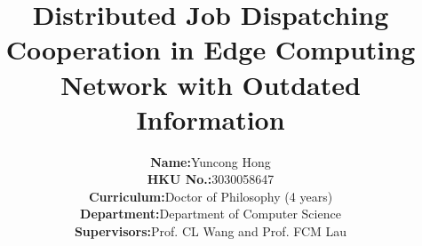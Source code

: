\documentclass[journal, 12pt, onecolumn, draftclsnofoot]{IEEEtran} %
\theoremstyle{definition}             %
\theoremstyle{remark}                 %
\theoremstyle{plain}                  %
\begin{document}
    \title{
        Distributed Job Dispatching Cooperation in Edge Computing Network with Outdated Information
    }

    \author{
        \begin{tabular}{rl}
            \textbf{Name: }&                Yuncong Hong \\
            \textbf{HKU No.:}&        3030058647 \\
            \textbf{Curriculum:}&           Doctor of Philosophy (4 years) \\
            \textbf{Department:}&           Department of Computer Science \\
            \textbf{Supervisors:}&          Prof. CL Wang and Prof. FCM Lau 
        \end{tabular}
    }

    \maketitle
    {
        \fancyhf{}
    }
    \thispagestyle{firststyle}
    

    
    

    
    

    
    
    
    

    
    

\end{document}
